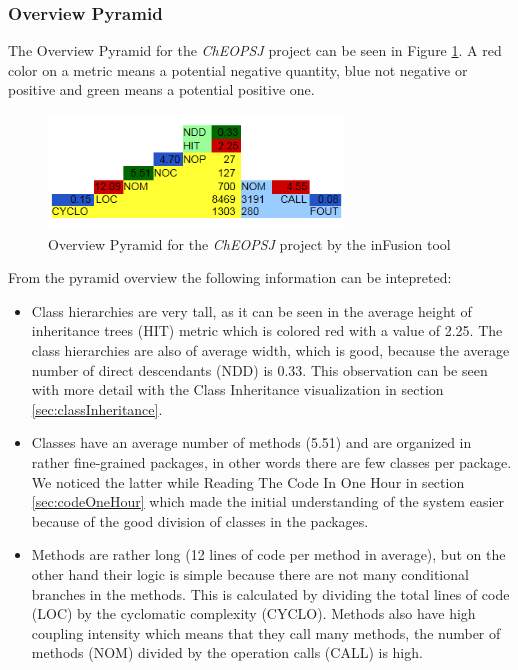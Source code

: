 \documentclass[a4paper]{article}
\begin{document}
\subsubsection{Overview Pyramid}
The Overview Pyramid for the \emph{ChEOPSJ} project can be seen in Figure \ref{fig:pyramid}.
A red color on a metric means a potential negative quantity, blue not negative or positive and green means a potential positive one.

\begin{figure}[h]
\centering
\includegraphics[width=0.7\textwidth]{Images/overviewPyramid}
\caption{Overview Pyramid for the \emph{ChEOPSJ} project by the inFusion tool}
\label{fig:pyramid}
\end{figure}

From the pyramid overview the following information can be intepreted:
\begin{itemize}
\item Class hierarchies are very tall, as it can be seen in the average height of inheritance trees (HIT) metric which is colored red with a value of 2.25. The class hierarchies are also of average width, which is good, because the average number of direct descendants (NDD) is 0.33. This observation can be seen with more detail with the Class Inheritance visualization in section \ref{sec:classInheritance}.

\item Classes have an average number of methods (5.51) and are organized in rather fine-grained packages, in other words there are few classes per package. We noticed the latter while Reading The Code In One Hour in section \ref{sec:codeOneHour} which made the initial understanding of the system easier because of the good division of classes in the packages.

\item Methods are rather long (12 lines of code per method in average), but on the other hand their logic is simple because there are not many conditional branches in the methods. This is calculated by dividing the total lines of code (LOC) by the cyclomatic complexity (CYCLO). Methods also have high coupling intensity which means that they call many methods, the number of methods (NOM) divided by the operation calls (CALL) is high.
\end{itemize}
\end{document}
